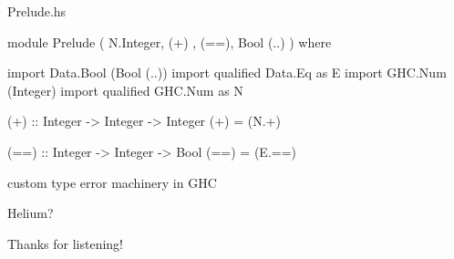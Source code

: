 \documentclass[UKenglish,usenames,dvipsnames,svgnames,table,aspectratio=169,mathserif]{beamer}
\begin{document}
\begin{frame}[fragile]

\begin{block}{Prelude.hs}
\begin{haskellcode}
module Prelude
  ( N.Integer, (+)
  , (==), Bool (..)
  )
where

import Data.Bool (Bool (..))
import qualified Data.Eq as E
import GHC.Num (Integer)
import qualified GHC.Num as N

(+) :: Integer -> Integer -> Integer
(+) = (N.+)

(==) :: Integer -> Integer -> Bool
(==) = (E.==)
\end{haskellcode}
\end{block}
\end{frame}

\begin{frame}

custom type error machinery in GHC

Helium?
\end{frame}


\begin{frame}
\huge \centering
Thanks for listening!
\end{frame}


\end{document}
